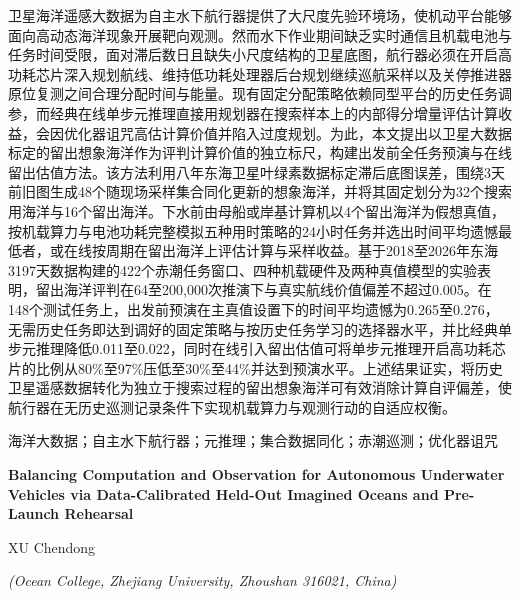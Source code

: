 卫星海洋遥感大数据为自主水下航行器提供了大尺度先验环境场，使机动平台能够面向高动态海洋现象开展靶向观测。然而水下作业期间缺乏实时通信且机载电池与任务时间受限，面对滞后数日且缺失小尺度结构的卫星底图，航行器必须在开启高功耗芯片深入规划航线、维持低功耗处理器后台规划继续巡航采样以及关停推进器原位复测之间合理分配时间与能量。现有固定分配策略依赖同型平台的历史任务调参，而经典在线单步元推理直接用规划器在搜索样本上的内部得分增量评估计算收益，会因优化器诅咒高估计算价值并陷入过度规划。为此，本文提出以卫星大数据标定的留出想象海洋作为评判计算价值的独立标尺，构建出发前全任务预演与在线留出估值方法。该方法利用八年东海卫星叶绿素数据标定滞后底图误差，围绕3天前旧图生成48个随现场采样集合同化更新的想象海洋，并将其固定划分为32个搜索用海洋与16个留出海洋。下水前由母船或岸基计算机以4个留出海洋为假想真值，按机载算力与电池功耗完整模拟五种用时策略的24小时任务并选出时间平均遗憾最低者，或在线按周期在留出海洋上评估计算与采样收益。基于2018至2026年东海3197天数据构建的422个赤潮任务窗口、四种机载硬件及两种真值模型的实验表明，留出海洋评判在64至200,000次推演下与真实航线价值偏差不超过0.005。在148个测试任务上，出发前预演在主真值设置下的时间平均遗憾为0.265至0.276，无需历史任务即达到调好的固定策略与按历史任务学习的选择器水平，并比经典单步元推理降低0.011至0.022，同时在线引入留出估值可将单步元推理开启高功耗芯片的比例从80\%至97\%压低至30\%至44\%并达到预演水平。上述结果证实，将历史卫星遥感数据转化为独立于搜索过程的留出想象海洋可有效消除计算自评偏差，使航行器在无历史巡测记录条件下实现机载算力与观测行动的自适应权衡。

\vspace{4pt}
海洋大数据；自主水下航行器；元推理；集合数据同化；赤潮巡测；优化器诅咒

\vspace{10pt}
\begin{center}
  {\bfseries Balancing Computation and Observation for Autonomous Underwater Vehicles via Data-Calibrated Held-Out Imagined Oceans and Pre-Launch Rehearsal\par}
  \vspace{4pt}
  { XU Chendong\par}
  {\itshape (Ocean College, Zhejiang University, Zhoushan 316021, China)\par}
\end{center}
\vspace{4pt}

